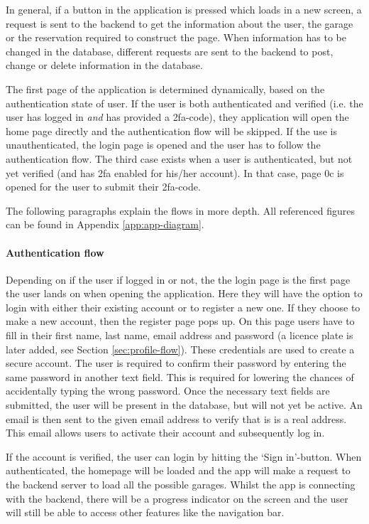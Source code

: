 \ind In general, if a button in the application is pressed which loads in a new screen, a request is sent to the backend to get the information about the user, the garage or the reservation required to construct the page. When information has to be changed in the database, different requests are sent to the backend to post, change or delete information in the database. 

\ind The first page of the application is determined dynamically, based on the authentication state of user. If the user is both authenticated and verified (i.e. the user has logged in \textit{and} has provided a \ac{2fa}-code), they application will open the home page directly and the authentication flow will be skipped. If the use is unauthenticated, the login page is opened and the user has to follow the authentication flow. The third case exists when a user is authenticated, but not yet verified (and has \ac{2fa} enabled for his/her account). In that case, page 0c is opened for the user to submit their \ac{2fa}-code.

\ind The following paragraphs explain the flows in more depth. All referenced figures can be found in Appendix \ref{app:app-diagram}.

\paragraph{Authentication flow}
Depending on if the user if logged in or not, the the login page is the first page the user lands on when opening the application. Here they will have the option to login with either their existing account or to register a new one. If they choose to make a new account, then the register page pops up. On this page users have to fill in their first name, last name, email address and password (a licence plate is later added, see Section \ref{sec:profile-flow}). These credentials are used to create a secure account. The user is required to confirm their password by entering the same password in another text field. This is required for lowering the chances of accidentally typing the wrong password. Once the necessary text fields are submitted, the user will be present in the database, but will not yet be active. An email is then sent to the given email address to verify that is is a real address. This email allows users to activate their account and subsequently log in.

\ind If the account is verified, the user can login by hitting the `Sign in'-button. When authenticated, the homepage will be loaded and the app will make a request to the backend server to load all the possible garages. Whilst the app is connecting with the backend, there will be a progress indicator on the screen and the user will still be able to access other features like the navigation bar.

